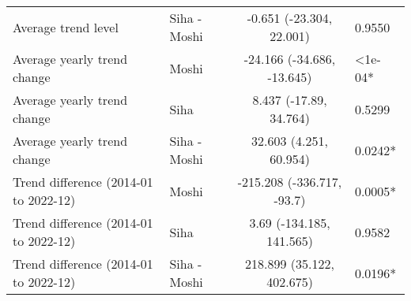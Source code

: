 \begin{longtable}{l|lcl}
Average trend level & Siha - Moshi & -0.651 (-23.304, 22.001) & 0.9550 \\ 
Average yearly trend change & Moshi & -24.166 (-34.686, -13.645) & <1e-04* \\ 
Average yearly trend change & Siha & 8.437 (-17.89, 34.764) & 0.5299 \\ 
Average yearly trend change & Siha - Moshi & 32.603 (4.251, 60.954) & 0.0242* \\ 
Trend difference (2014-01 to 2022-12) & Moshi & -215.208 (-336.717, -93.7) & 0.0005* \\ 
Trend difference (2014-01 to 2022-12) & Siha & 3.69 (-134.185, 141.565) & 0.9582 \\ 
Trend difference (2014-01 to 2022-12) & Siha - Moshi & 218.899 (35.122, 402.675) & 0.0196* \\ 
\bottomrule
\end{longtable}

